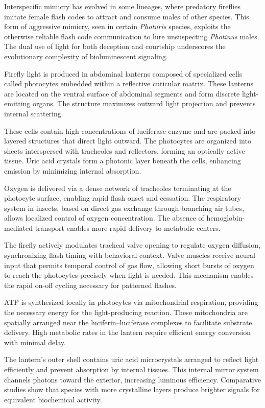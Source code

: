 Interspecific mimicry has evolved in some lineages, where predatory fireflies imitate female flash codes to attract and consume males of other species. This form of aggressive mimicry, seen in certain \emph{Photuris} species, exploits the otherwise reliable flash code communication to lure unsuspecting \emph{Photinus} males. The dual use of light for both deception and courtship underscores the evolutionary complexity of bioluminescent signaling.

Firefly light is produced in abdominal lanterns composed of specialized cells called photocytes embedded within a reflective cuticular matrix. These lanterns are located on the ventral surface of abdominal segments and form discrete light-emitting organs. The structure maximizes outward light projection and prevents internal scattering.

These cells contain high concentrations of luciferase enzyme and are packed into layered structures that direct light outward. The photocytes are organized into sheets interspersed with tracheoles and reflectors, forming an optically active tissue. Uric acid crystals form a photonic layer beneath the cells, enhancing emission by minimizing internal absorption.

Oxygen is delivered via a dense network of tracheoles terminating at the photocyte surface, enabling rapid flash onset and cessation. The respiratory system in insects, based on direct gas exchange through branching air tubes, allows localized control of oxygen concentration. The absence of hemoglobin-mediated transport enables more rapid delivery to metabolic centers.

The firefly actively modulates tracheal valve opening to regulate oxygen diffusion, synchronizing flash timing with behavioral context. Valve muscles receive neural input that permits temporal control of gas flow, allowing short bursts of oxygen to reach the photocytes precisely when light is needed. This mechanism enables the rapid on-off cycling necessary for patterned flashes.

ATP is synthesized locally in photocytes via mitochondrial respiration, providing the necessary energy for the light-producing reaction. These mitochondria are spatially arranged near the luciferin–luciferase complexes to facilitate substrate delivery. High metabolic rates in the lantern require efficient energy conversion with minimal delay.

The lantern’s outer shell contains uric acid microcrystals arranged to reflect light efficiently and prevent absorption by internal tissues. This internal mirror system channels photons toward the exterior, increasing luminous efficiency. Comparative studies show that species with more crystalline layers produce brighter signals for equivalent biochemical activity.

